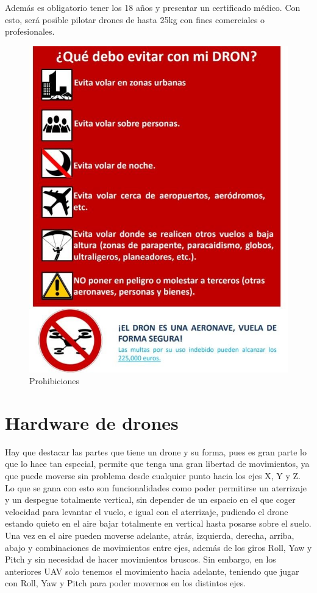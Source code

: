 Además es obligatorio tener los 18 años y presentar un certificado médico. Con esto, será posible pilotar drones de hasta 25kg con fines comerciales o profesionales.

\begin{figure}[H]
  \centering
  \includegraphics[scale=0.3]{imagenes/prohibiciones.jpg}
  \caption{Prohibiciones}
  \label{fig:prohibiciones}
\end{figure}


\section{Hardware de drones}

Hay que destacar las partes que tiene un drone y su forma, pues es gran parte
lo que lo hace tan especial, permite que tenga una gran libertad de movimientos, ya
que puede moverse sin problema desde cualquier punto hacia los ejes X, Y y Z. Lo
que se gana con esto son funcionalidades como poder permitirse un aterrizaje y un
despegue totalmente vertical, sin depender de un espacio en el que coger velocidad
para levantar el vuelo, e igual con el aterrizaje, pudiendo el drone estando quieto en
el aire bajar totalmente en vertical hasta posarse sobre el suelo. Una vez en el aire
pueden moverse adelante, atrás, izquierda, derecha, arriba, abajo y combinaciones de
movimientos entre ejes, además de los giros Roll, Yaw y Pitch y sin necesidad de hacer
movimientos bruscos. Sin embargo, en los anteriores UAV solo tenemos el movimiento
hacia adelante, teniendo que jugar con Roll, Yaw y Pitch para poder movernos en los
distintos ejes.

